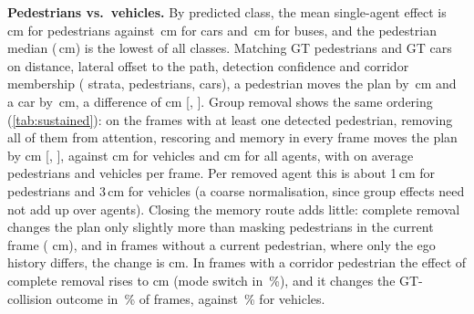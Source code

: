 \documentclass[journal]{IEEEtran}
\begin{document}
\begin{table}[t]
\centering
\caption{Concept $\rightarrow$ planner on validation pedestrians: positive minus negative attention percentile and
masking effect (cm), averaged over distance bins (0--15, 15--30, 30--100\,m); scene-bootstrap 95\,\% CIs.
$n_+$ = positive pedestrian-frames.}
\label{tab:conceptplanner}
\footnotesize
\setlength{\tabcolsep}{2pt}
\end{table}

\textbf{Pedestrians vs.\ vehicles.} By predicted class, the mean single-agent effect is \ClsPedMean\,cm for pedestrians
against \ClsCarMean\,cm for cars and \ClsBusMean\,cm for buses, and the pedestrian median (\ClsPedMed\,cm) is the lowest
of all classes. Matching GT pedestrians and GT cars on distance, lateral offset to the path, detection confidence and
corridor membership (\MatchNstrata{} strata, \MatchNped{} pedestrians, \MatchNcar{} cars), a pedestrian moves the plan
by \MatchPed\,cm and a car by \MatchCar\,cm, a difference of \MatchDiff{} cm [\MatchDiffLo, \MatchDiffHi]. Group removal
shows the same ordering (\cref{tab:sustained}): on the \SgPedsNfr{} frames with at least one detected pedestrian,
removing all of them from attention, rescoring and memory in every frame moves the plan by \SgPedsFull{} cm
[\SgPedsFullLo, \SgPedsFullHi], against \SgVehFull{} cm for vehicles and \SgAgentsFull{} cm for all agents, with on
average \SgPedsPerFrame{} pedestrians and \SgVehPerFrame{} vehicles per frame. Per removed agent this is about 1\,cm for
pedestrians and 3\,cm for vehicles (a coarse normalisation, since group effects need not add up over agents). Closing the memory route adds little:
complete removal changes the plan only slightly more than masking pedestrians in the current frame (\SgPedsCur{} cm),
and in frames without a current pedestrian, where only the ego history differs, the change is \SgPedsAbsent{} cm. In
frames with a corridor pedestrian the effect of complete removal rises to \SgPedsFullCorr{} cm (mode switch in
\SgPedsFullCorrMode\,\%), and it changes the GT-collision outcome in \SgPedsColFlip\,\% of frames, against
\SgVehColFlip\,\% for vehicles.
\end{document}

